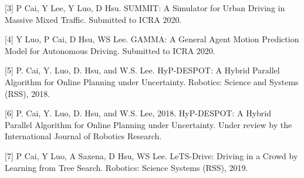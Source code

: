 \documentclass{article}
\begin{document}
[3] P Cai, Y Lee, Y Luo, D Hsu. SUMMIT: A Simulator for Urban Driving in Massive Mixed Traffic. Submitted to ICRA 2020. 

[4] Y Luo, P Cai, D Hsu, WS Lee. GAMMA: A General Agent Motion Prediction Model for Autonomous Driving. Submitted to ICRA 2020. 

[5] P. Cai, Y. Luo, D. Hsu, and W.S. Lee. HyP-DESPOT: A Hybrid Parallel Algorithm for Online Planning under Uncertainty. Robotics: Science and Systems (RSS), 2018. 

[6] P. Cai, Y. Luo, D. Hsu, and W.S. Lee, 2018. HyP-DESPOT: A Hybrid Parallel Algorithm for Online Planning under Uncertainty. Under review by the International Journal of Robotics Research. 

[7] P Cai, Y Luo, A Saxena, D Hsu, WS Lee. LeTS-Drive: Driving in a Crowd by Learning from Tree Search. Robotics: Science Systems (RSS), 2019. 
\end{document}
